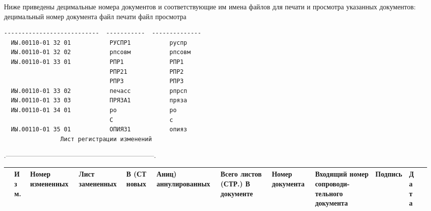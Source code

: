 \documentclass[11pt,a4paper]{article}
\begin{document}
Ниже приведены децимальные номера документов и соответствующие им имена файлов для печати и просмотра указанных документов: децимальный номер документа файл печати файл просмотра

\begin{center}\small
\begin{BVerbatim}
---------------------------  -----------  --------------
  ИЫ.00110-01 32 01           РУСПР1           руспр
  ИЫ.00110-01 32 02           рпсовм           рпсовм
  ИЫ.00110-01 33 01           РПР1             РПР1
                              РПР21            РПР2
                              РПР3             РПР3
  ИЫ.00110-01 33 02           печасс           рпрсп
  ИЫ.00110-01 33 03           ПРЯЗА1           пряза
  ИЫ.00110-01 34 01           ро               ро
                              С                с
  ИЫ.00110-01 35 01           ОПИЯЗ1           опияз
                Лист регистрации изменений
\end{BVerbatim}
\end{center}

.-----------------------------------------------------------------.

\begin{center}\small\begin{tabularx}{\linewidth}{|>{\raggedright\arraybackslash\hsize=0.176\hsize}X|>{\raggedright\arraybackslash\hsize=0.706\hsize}X|>{\raggedright\arraybackslash\hsize=1.059\hsize}X|>{\raggedright\arraybackslash\hsize=1.059\hsize}X|>{\raggedright\arraybackslash\hsize=1.059\hsize}X|>{\raggedright\arraybackslash\hsize=1.059\hsize}X|>{\raggedright\arraybackslash\hsize=1.235\hsize}X|>{\raggedright\arraybackslash\hsize=1.588\hsize}X|>{\raggedright\arraybackslash\hsize=1.941\hsize}X|>{\raggedright\arraybackslash\hsize=1.235\hsize}X|>{\raggedright\arraybackslash\hsize=0.706\hsize}X|>{\raggedright\arraybackslash\hsize=0.176\hsize}X|}\hline
 & \small\bfseries\hspace{0pt}И з м. & \small\bfseries\hspace{0pt}Номер измененных & \small\bfseries\hspace{0pt}Лист замененных & \small\bfseries\hspace{0pt}В (СТ новых & \small\bfseries\hspace{0pt}Аниц) аннулированных & \small\bfseries\hspace{0pt}Всего листов (СТР.) В документе & \small\bfseries\hspace{0pt}Номер документа & \small\bfseries\hspace{0pt}Входящий номер сопроводи-тельного документа & \small\bfseries\hspace{0pt}Подпись & \small\bfseries\hspace{0pt}Д а т а &  \\ \hline
\end{tabularx}\end{center}
\end{document}
